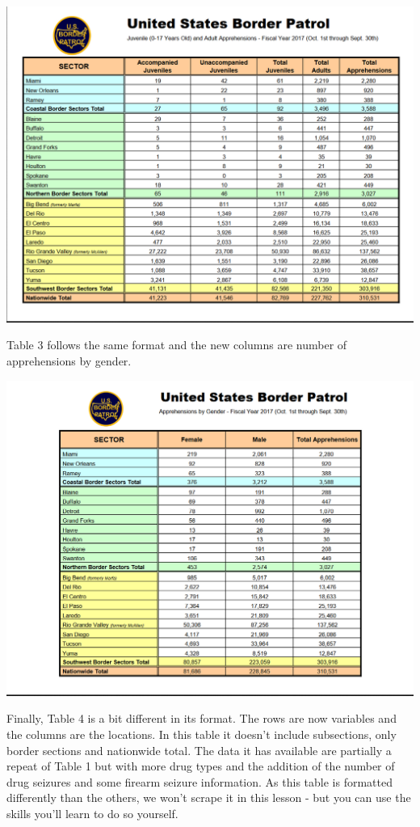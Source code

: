 \documentclass[
]{krantz}
\begin{document}
\includegraphics{images/pdf_table_2.PNG}

Table 3 follows the same format and the new columns are number of apprehensions by gender.

\includegraphics{images/pdf_table_3.PNG}

Finally, Table 4 is a bit different in its format. The rows are now variables and the columns are the locations. In this table it doesn't include subsections, only border sections and nationwide total. The data it has available are partially a repeat of Table 1 but with more drug types and the addition of the number of drug seizures and some firearm seizure information. As this table is formatted differently than the others, we won't scrape it in this lesson - but you can use the skills you'll learn to do so yourself.
\end{document}
